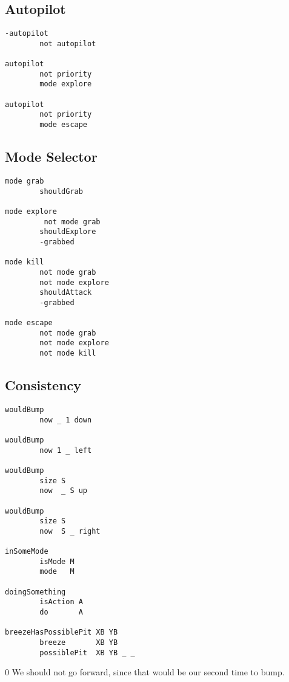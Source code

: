 \hypertarget{autopilot}{%
\subsection{Autopilot}\label{autopilot}}

\begin{verbatim}
-autopilot
        not autopilot

autopilot
        not priority
        mode explore

autopilot
        not priority
        mode escape
\end{verbatim}

\hypertarget{mode-selector}{%
\subsection{Mode Selector}\label{mode-selector}}

\begin{verbatim}
mode grab
        shouldGrab

mode explore
         not mode grab
        shouldExplore
        -grabbed

mode kill
        not mode grab
        not mode explore
        shouldAttack
        -grabbed

mode escape
        not mode grab
        not mode explore
        not mode kill
\end{verbatim}

\hypertarget{consistency}{%
\subsection{Consistency}\label{consistency}}

\begin{verbatim}
wouldBump
        now _ 1 down

wouldBump
        now 1 _ left

wouldBump
        size S
        now  _ S up

wouldBump
        size S
        now  S _ right

inSomeMode
        isMode M
        mode   M

doingSomething
        isAction A
        do       A

breezeHasPossiblePit XB YB
        breeze       XB YB
        possiblePit  XB YB _ _
\end{verbatim}

0 We should not go forward, since that would be our second time to bump.


